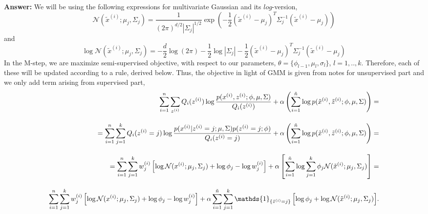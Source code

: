 \documentclass{article}
\begin{document}
\begin{enumerate}[label=(\alph*)]
\textbf{Answer:}
We will be using the following expressions for multivariate Gaussian and its $log$-version,
\[
\mathcal{N}(\tilde{x}^{(i)} ; \mu_j, \Sigma_j) = \frac{1}{(2\pi)^{d/2} |\Sigma_j|^{1/2}} \exp\left(-\frac{1}{2} (\tilde{x}^{(i)} - \mu_j)^T \Sigma_j^{-1} (\tilde{x}^{(i)} - \mu_j)\right)
\]
and 
\[
\log\mathcal{N}(\tilde{x}^{(i)};\mu_j,\Sigma_j) = -\frac{d}{2}\log(2\pi) - \frac{1}{2}\log|\Sigma_j| - \frac{1}{2}(\tilde{x}^{(i)} - \mu_j)^T \Sigma_j^{-1} (\tilde{x}^{(i)} - \mu_j)
\]
In the M-step, we are maximize semi-supervised objective, with respect to our parameters, $\theta = \{\phi_{l-1}, \mu_l, \sigma_l\}$, $l=1,..,k$. Therefore, each of these will be updated according to a rule, derived below. Thus, the objective in light of GMM is given from notes for unsupervised part and we only add term arising from supervised part,
 \begin{align*}
\sum_{i=1}^{n} \sum_{z^{(i)}} Q_i(z^{(i)}) \log \frac{p(x^{(i)}, z^{(i)}; \phi, \mu, \Sigma)}{Q_i(z^{(i)})} + \alpha \left(\sum_{i=1}^{\tilde{n}} \log p(\tilde{x}^{(i)}, \tilde{z}^{(i)}; \phi, \mu, \Sigma)\right) = \\[10pt]
= \sum_{i=1}^{n} \sum_{j=1}^{k} Q_i(z^{(i)} = j) \log \frac{p(x^{(i)}|z^{(i)} = j; \mu, \Sigma)p(z^{(i)} = j; \phi)}{ Q_i(z^{(i)} = j)} + \alpha \left(\sum_{i=1}^{\tilde{n}} \log p(\tilde{x}^{(i)}, \tilde{z}^{(i)}; \phi, \mu, \Sigma)\right) =\\[10pt]
= \sum_{i=1}^{n} \sum_{j=1}^{k} w_j^{(i)}\left[ \log \mathcal{N}(x^{(i)};\mu_j,\Sigma_j) + \log\phi_j - \log w_j^{(i)}\right] + {\color{black}\alpha\left[\sum_{i=1}^{\tilde{n}}\log\sum_{j=1}^{k}\phi_j\mathcal{N}(\tilde{x}^{(i)};\mu_j,\Sigma_j)\right]}=\\[10pt]
 \sum_{i=1}^{n} \sum_{j=1}^{k} w_j^{(i)}\left[ \log \mathcal{N}(x^{(i)};\mu_j,\Sigma_j) + \log\phi_j - \log w_j^{(i)}\right] +{\color{black}\alpha \sum\limits_{i=1}^{\tilde{n}}\sum\limits_{j=1}^{k}\mathds{1}_{\{\tilde{z}^{(i)}=j\}}\left[\log\phi_j + \log\mathcal{N}(\tilde{x}^{(i)};\mu_j,\Sigma_j)\right]}.
\end{align*}


\end{enumerate}
\end{document}
